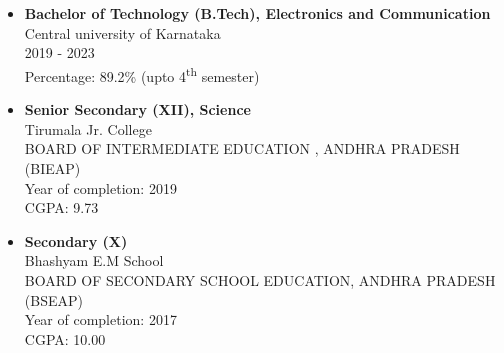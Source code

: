 \documentclass[]{article}
\begin{document}
\section*{\color{blue}{Education}}%
    \begin{itemize}
        \item \textbf{Bachelor of Technology (B.Tech), Electronics and Communication} \\Central university of Karnataka \\2019 - 2023 \\Percentage: 89.2\% (upto 4\textsuperscript{th} semester)
	   \item \textbf{Senior Secondary (XII), Science} \\Tirumala Jr. College\\BOARD OF INTERMEDIATE EDUCATION , ANDHRA PRADESH (BIEAP)\\Year of completion: 2019\\CGPA: 9.73
	  \item \textbf{Secondary (X)} \\Bhashyam E.M School\\BOARD OF SECONDARY SCHOOL EDUCATION, ANDHRA PRADESH (BSEAP)\\Year of completion: 2017\\ CGPA: 10.00
    \end{itemize} 
\end{document}
